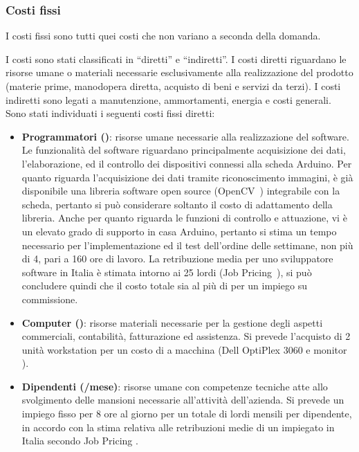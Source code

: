 \subsubsection{Costi fissi}
I costi fissi sono tutti quei costi che non variano a seconda della domanda.

I costi sono stati classificati in “diretti” e “indiretti”. I costi diretti
riguardano le risorse umane o materiali necessarie esclusivamente alla
realizzazione del prodotto (materie prime, manodopera diretta, acquisto di beni
e servizi da terzi). I costi indiretti sono legati a manutenzione, ammortamenti,
energia e costi generali.\\
%
Sono stati individuati i seguenti costi fissi diretti:
\begin{itemize}
\item \textbf{Programmatori ()}: risorse umane necessarie alla
realizzazione del software.  Le funzionalità del software riguardano
principalmente acquisizione dei dati, l’elaborazione, ed il controllo dei
dispositivi connessi alla scheda Arduino.  Per quanto riguarda l’acquisizione
dei dati tramite riconoscimento immagini, è già disponibile una libreria
software open source (OpenCV~\cite{opencv}) integrabile con la scheda, pertanto
si può considerare soltanto il costo di adattamento della libreria. Anche per
quanto riguarda le funzioni di controllo e attuazione, vi è un elevato grado di
supporto in casa Arduino, pertanto si stima un tempo necessario per
l’implementazione ed il test dell’ordine delle settimane, non più di 4, pari a
160 ore di lavoro. La retribuzione media per uno sviluppatore software in Italia
è stimata intorno ai 25 \EUR{} lordi (Job Pricing~\cite{corcom}), si può
concludere quindi che il costo totale sia al più di  per un impiego
su commissione. 
\item \textbf{Computer ()}: risorse materiali
necessarie per la gestione degli aspetti commerciali, contabilità, fatturazione
ed assistenza. Si prevede l’acquisto di 2 unità workstation per un costo di
 a macchina (Dell OptiPlex 3060 e monitor \cite{dell}).  
\item \textbf{Dipendenti (/mese)}: risorse umane con competenze
tecniche atte allo svolgimento delle mansioni necessarie all’attività
dell’azienda. Si prevede un impiego fisso per 8 ore al giorno per un totale di
 lordi mensili per dipendente, in accordo con la stima relativa alle
retribuzioni medie di un impiegato in Italia secondo Job Pricing \cite{money}.
\end{itemize}

